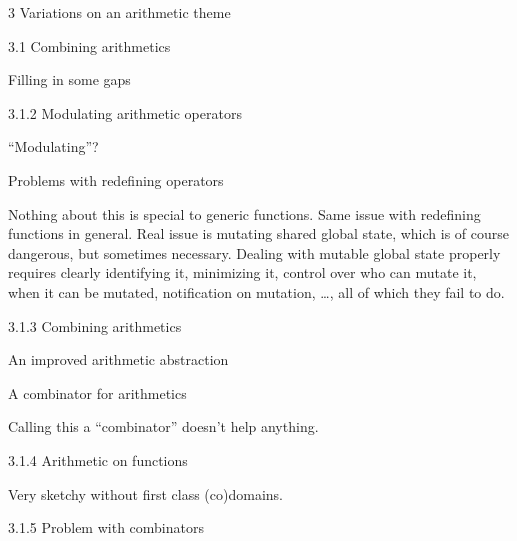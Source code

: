 \documentclass[12pt]{PalisadesLakesBook}
\begin{document}
\begin{plSection}{3 Variations on an arithmetic theme}
\begin{plSection}{3.1 Combining arithmetics}
\begin{plSection}{Filling in some gaps}
\end{plSection}%
\begin{plSection}{3.1.2 Modulating arithmetic operators}

``Modulating''?

\begin{plSection}{Problems with redefining operators}

Nothing about this is special to generic functions.
Same issue with redefining functions in general.
Real issue is mutating shared global state,
which is of course dangerous, but sometimes necessary.
Dealing with mutable global state properly requires
clearly identifying it, minimizing it,
control over who can mutate it,
when it can be mutated,
notification on mutation, {\ldots},
all of which they fail to do.

\end{plSection}%
\end{plSection}%
\begin{plSection}{3.1.3 Combining arithmetics}
\begin{plSection}{An improved arithmetic abstraction}
\end{plSection}%
\begin{plSection}{A combinator for arithmetics}

Calling this a ``combinator'' doesn't help anything.

\end{plSection}%
\begin{plSection}{3.1.4 Arithmetic on functions}

Very sketchy without first class (co)domains.

\end{plSection}%
\begin{plSection}{3.1.5 Problem with combinators}


\end{plSection}
\end{plSection}
\end{plSection}
\end{plSection}
\end{document}

